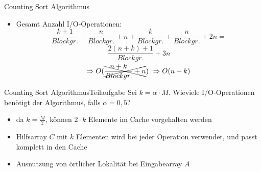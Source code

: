 \documentclass{beamer}
\begin{document}
\begin{frame}{Counting Sort Algorithmus}
  \begin{itemize}
    \item Gesamt Anzahl I/O-Operationen:
    \begin{equation*}
      \frac{k+1}{Blockgr.} +
      \frac{n}{Blockgr.} + n +
      \frac{k}{Blockgr.} +
      \frac{n}{Blockgr.} + 2n =
    \end{equation*}
    \begin{equation*}
      \frac{2(n+k)+1}{Blockgr.}+3n
    \end{equation*}
    \begin{equation*}
      \Rightarrow O(\xcancel{\frac{n+k}{Blockgr.}+n}) ~\Rightarrow
      O(n + k)
    \end{equation*}
  \end{itemize}
\end{frame}

\begin{frame}{Counting Sort Algorithmus}{Teilaufgabe}
  Sei $k = \alpha \cdot M$. Wieviele I/O-Operationen benötigt der Algorithmus, falls $\alpha = 0,5$?
  \begin{itemize}
    \item da $k = \frac{M}{2}$, können $2\cdot k$ Elemente im Cache vorgehalten werden
    \item Hilfsarray $C$ mit $k$ Elementen wird bei jeder Operation verwendet, und passt komplett in den Cache
    \item Ausnutzung von örtlicher Lokalität bei Eingabearray $A$
  \end{itemize}
\end{frame}
\end{document}
